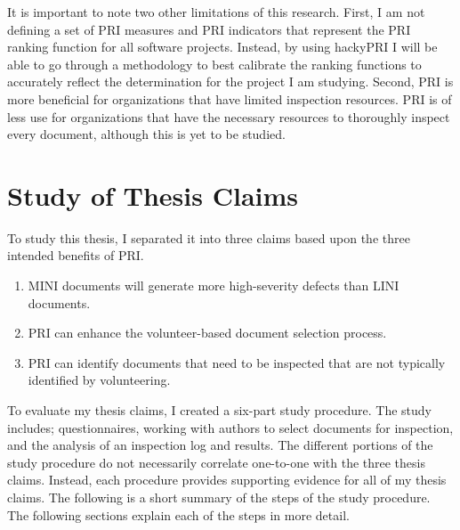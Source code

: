 
It is important to note two other limitations of this research. First, I am
not defining a set of PRI measures and PRI indicators that represent the
PRI ranking function for all software projects. Instead, by using hackyPRI
I will be able to go through a methodology to best calibrate the ranking
functions to accurately reflect the determination for the project I am
studying.  Second, PRI is more beneficial for organizations that have
limited inspection resources. PRI is of less use for organizations that
have the necessary resources to thoroughly inspect every document, although
this is yet to be studied.




\section{Study of Thesis Claims}
To study this thesis, I separated it into three claims based upon the
three intended benefits of PRI.

\begin{enumerate}
\item MINI documents will generate more high-severity defects than LINI
  documents.
\item PRI can enhance the volunteer-based document selection process. 
\item PRI can identify documents that need to be inspected that are not
  typically identified by volunteering.
\end{enumerate}

To evaluate my thesis claims, I created a six-part study procedure. The
study includes; questionnaires, working with authors to select documents
for inspection, and the analysis of an inspection log and results. The
different portions of the study procedure do not necessarily correlate
one-to-one with the three thesis claims. Instead, each procedure provides
supporting evidence for all of my thesis claims. The following is a short
summary of the steps of the study procedure. The following sections explain
each of the steps in more detail.

